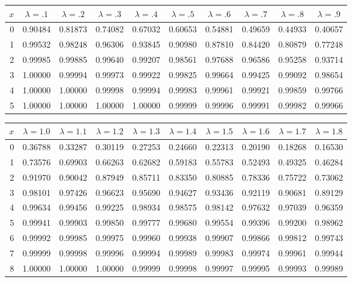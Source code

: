 \def\HEADER{$x$
    &  $\lambda=.1$  &  $\lambda=.2$  &  $\lambda=.3$  &  $\lambda=.4$  &  $\lambda=.5$
    &  $\lambda=.6$  &  $\lambda=.7$  &  $\lambda=.8$  &  $\lambda=.9$ \\\hline}

\medskip\begin{tabular}{r|*{9}{c}}
$x$ &  $\lambda=.1$  &  $\lambda=.2$  &  $\lambda=.3$  &  $\lambda=.4$  &  $\lambda=.5$
    &  $\lambda=.6$  &  $\lambda=.7$  &  $\lambda=.8$  &  $\lambda=.9$                       \\\hline
  0 & 0.90484 & 0.81873 & 0.74082 & 0.67032 & 0.60653 & 0.54881 & 0.49659 & 0.44933 & 0.40657 \\
  1 & 0.99532 & 0.98248 & 0.96306 & 0.93845 & 0.90980 & 0.87810 & 0.84420 & 0.80879 & 0.77248 \\
  2 & 0.99985 & 0.99885 & 0.99640 & 0.99207 & 0.98561 & 0.97688 & 0.96586 & 0.95258 & 0.93714 \\
  3 & 1.00000 & 0.99994 & 0.99973 & 0.99922 & 0.99825 & 0.99664 & 0.99425 & 0.99092 & 0.98654 \\
  4 & 1.00000 & 1.00000 & 0.99998 & 0.99994 & 0.99983 & 0.99961 & 0.99921 & 0.99859 & 0.99766 \\
  5 & 1.00000 & 1.00000 & 1.00000 & 1.00000 & 0.99999 & 0.99996 & 0.99991 & 0.99982 & 0.99966 \\
\end{tabular}

\myskip
\begin{tabular}{r|*{9}{c}}
$x$ &  $\lambda=1.0$  &  $\lambda=1.1$  &  $\lambda=1.2$  &  $\lambda=1.3$  &  $\lambda=1.4$
    &  $\lambda=1.5$  &  $\lambda=1.6$  &  $\lambda=1.7$  &  $\lambda=1.8$                    \\\hline
  0 & 0.36788 & 0.33287 & 0.30119 & 0.27253 & 0.24660 & 0.22313 & 0.20190 & 0.18268 & 0.16530 \\
  1 & 0.73576 & 0.69903 & 0.66263 & 0.62682 & 0.59183 & 0.55783 & 0.52493 & 0.49325 & 0.46284 \\
  2 & 0.91970 & 0.90042 & 0.87949 & 0.85711 & 0.83350 & 0.80885 & 0.78336 & 0.75722 & 0.73062 \\
  3 & 0.98101 & 0.97426 & 0.96623 & 0.95690 & 0.94627 & 0.93436 & 0.92119 & 0.90681 & 0.89129 \\
  4 & 0.99634 & 0.99456 & 0.99225 & 0.98934 & 0.98575 & 0.98142 & 0.97632 & 0.97039 & 0.96359 \\
  5 & 0.99941 & 0.99903 & 0.99850 & 0.99777 & 0.99680 & 0.99554 & 0.99396 & 0.99200 & 0.98962 \\
  6 & 0.99992 & 0.99985 & 0.99975 & 0.99960 & 0.99938 & 0.99907 & 0.99866 & 0.99812 & 0.99743 \\
  7 & 0.99999 & 0.99998 & 0.99996 & 0.99994 & 0.99989 & 0.99983 & 0.99974 & 0.99961 & 0.99944 \\
  8 & 1.00000 & 1.00000 & 1.00000 & 0.99999 & 0.99998 & 0.99997 & 0.99995 & 0.99993 & 0.99989 \\
\end{tabular}

